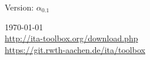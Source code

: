 \begin{titlepage}
\begin{figure}[ht]
\begin{minipage}{.83\textwidth}
\begin{minipage}[t]{1\linewidth}

\vspace{0.5cm}




\vspace{10cm}

\vspace{1cm}
			
		Version: $\alpha_{0.1}$
		
			\today \\
			\url{http://ita-toolbox.org/download.php}\\
			\url{https://git.rwth-aachen.de/ita/toolbox}
\end{minipage}
\end{minipage}
\end{figure}	
\end{titlepage}
\restoregeometry